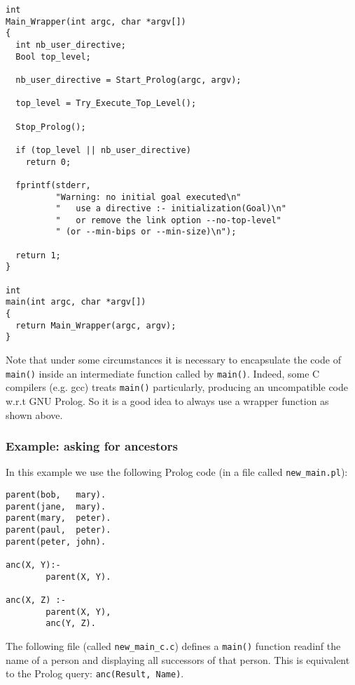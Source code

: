 \begin{Indentation}
\begin{verbatim}
int
Main_Wrapper(int argc, char *argv[])
{
  int nb_user_directive;
  Bool top_level;

  nb_user_directive = Start_Prolog(argc, argv);

  top_level = Try_Execute_Top_Level();

  Stop_Prolog();

  if (top_level || nb_user_directive)
    return 0;

  fprintf(stderr,
          "Warning: no initial goal executed\n"
          "   use a directive :- initialization(Goal)\n"
          "   or remove the link option --no-top-level"
          " (or --min-bips or --min-size)\n");

  return 1;
}

int
main(int argc, char *argv[])
{
  return Main_Wrapper(argc, argv);
}
\end{verbatim}
\end{Indentation}

Note that under some circumstances it is necessary to encapsulate the code of
\texttt{main()} inside an intermediate function called by
\texttt{main()}. Indeed, some C compilers (e.g. gcc) treats \texttt{main()}
particularly, producing an uncompatible code w.r.t GNU Prolog. So it is a
good idea to always use a wrapper function as shown above.

\subsubsection{Example: asking for ancestors}

In this example we use the following Prolog code (in a file called 
\texttt{new\_main.pl}):

\begin{Indentation}
\begin{verbatim}
parent(bob,   mary).
parent(jane,  mary).
parent(mary,  peter).
parent(paul,  peter).
parent(peter, john).

anc(X, Y):-
        parent(X, Y).

anc(X, Z) :-
        parent(X, Y),
        anc(Y, Z).
\end{verbatim}
\end{Indentation}

The following file (called \texttt{new\_main\_c.c}) defines a \texttt{main()}
function readinf the name of a person and displaying all successors of that
person. This is equivalent to the Prolog query: \texttt{anc(Result, Name)}.

